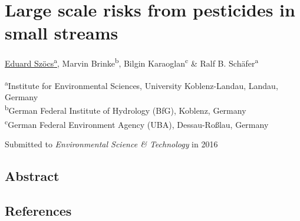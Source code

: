 \chapter{Large scale risks from pesticides in small streams}
\label{sec:smallstreams}  

\begin{sloppypar}
\bigskip
\underline{Eduard Szöcs\textsuperscript{a}}, Marvin Brinke\textsuperscript{b}, Bilgin Karaoglan\textsuperscript{c} \& Ralf B. Schäfer\textsuperscript{a}

\bigskip
\small
\noindent 
\textsuperscript{a}Institute for Environmental Sciences, University Koblenz-Landau, Landau, Germany \\
\textsuperscript{b}German Federal Institute of Hydrology (BfG), Koblenz, Germany \\
\textsuperscript{c}German Federal Environment Agency (UBA), Dessau-Roßlau, Germany

\bigskip 
\normalsize
\noindent
Submitted to \emph{Environmental Science \& Technology} in 2016

\end{sloppypar}
\newpage


\section{Abstract}



\section{References}
\printbibliography[heading=none,sorting=nyt]
